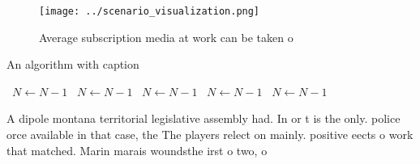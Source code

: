 \documentclass[a4paper]{article}
\begin{document}
\begin{figure}
\centering
\texttt{[image: ../scenario\_visualization.png]}
\caption{Average subscription media at work can be taken o
}
\end{figure}
 
\begin{algorithm}
\caption{An algorithm with caption}
\begin{algorithmic}
\    \State $N \gets N - 1$
\    \State $N \gets N - 1$
\    \State $N \gets N - 1$
\    \State $N \gets N - 1$
\    \State $N \gets N - 1$
\EndWhile
\end{algorithmic}
\end{algorithm}

A dipole montana territorial legislative assembly had. In or t is the only. police orce available in that case, the The players relect on mainly. positive eects o work that matched. Marin marais woundsthe irst o two, o 
\end{document}
